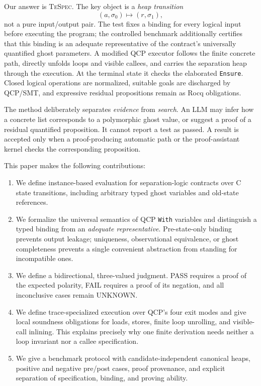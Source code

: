 \documentclass[10pt]{article}
\newcommand{\tespec}{\textsc{TeSpec}}
\newcommand{\qcp}{\textsc{QCP}}
\newcommand{\rocq}{Rocq}
\newcommand{\pass}{\textsf{PASS}}
\newcommand{\fail}{\textsf{FAIL}}
\newcommand{\unknown}{\textsf{UNKNOWN}}
\begin{document}
Our answer is \tespec.  The key object is a \emph{heap transition}
\[
  (a,\sigma_0) \longmapsto (r,\sigma_1),
\]
not a pure input/output pair.  The test fixes a binding for every logical input
before executing the program; the controlled benchmark additionally certifies
that this binding is an adequate representative of the contract's universally
quantified ghost parameters.  A modified \qcp{} executor follows the finite
concrete path, directly unfolds loops and visible callees, and carries the
separation heap through the execution.  At the terminal state it checks the
elaborated \texttt{Ensure}.  Closed logical operations are normalized,
suitable goals are discharged by \qcp/SMT, and expressive residual
propositions remain as \rocq{} obligations.

The method deliberately separates \emph{evidence} from \emph{search}.
An LLM may infer how a concrete list corresponds to a polymorphic ghost value,
or suggest a proof of a residual quantified proposition.  It cannot report a
test as passed.  A result is accepted only when a proof-producing automatic
path or the proof-assistant kernel checks the corresponding proposition.

This paper makes the following contributions:

\begin{enumerate}[leftmargin=1.4em]
  \item We define instance-based evaluation for separation-logic contracts over
        C state transitions, including arbitrary typed ghost variables and
        old-state references.
  \item We formalize the universal semantics of QCP \texttt{With} variables
        and distinguish a typed binding from an \emph{adequate
        representative}.  Pre-state-only binding prevents output leakage;
        uniqueness, observational equivalence, or ghost completeness prevents
        a single convenient abstraction from standing for incompatible ones.
  \item We define a bidirectional, three-valued judgment.  \pass{} requires a
        proof of the expected polarity, \fail{} requires a proof of its
        negation, and all inconclusive cases remain \unknown.
  \item We define trace-specialized execution over QCP's four exit modes and
        give local soundness obligations for loads, stores, finite loop
        unrolling, and visible-call inlining.  This explains precisely why one
        finite derivation needs neither a loop invariant nor a callee
        specification.
  \item We give a benchmark protocol with candidate-independent canonical
        heaps, positive and negative pre/post cases, proof provenance, and
        explicit separation of specification, binding, and proving ability.
\end{enumerate}
\end{document}
